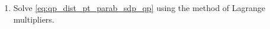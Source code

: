 \begin{enumerate}[label=\thesubsection.\arabic*.,ref=\thesubsection.\theenumi]
\item Solve \eqref{eq:qp_dist_pt_parab_sdp_qp} using the method of Lagrange multipliers.
%
%
%
%	
%
\end{enumerate}
